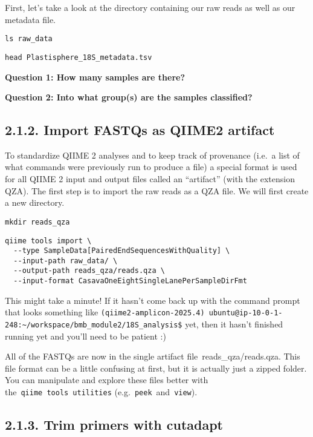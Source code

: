 \documentclass[
]{book}
\begin{document}
First, let's take a look at the directory containing our raw reads as well as our metadata file.

\begin{verbatim}
ls raw_data
\end{verbatim}

\begin{verbatim}
head Plastisphere_18S_metadata.tsv
\end{verbatim}

\textbf{Question 1: How many samples are there?}

\textbf{Question 2: Into what group(s) are the samples classified?}

\subsection{2.1.2. Import FASTQs as QIIME2 artifact}\label{import-fastqs-as-qiime2-artifact-1}

To standardize QIIME 2 analyses and to keep track of provenance (i.e.~a list of what commands were previously run to produce a file) a special format is used for all QIIME 2 input and output files called an ``artifact'' (with the extension QZA). The first step is to import the raw reads as a QZA file. We will first create a new directory.

\begin{verbatim}
mkdir reads_qza
\end{verbatim}

\begin{verbatim}
qiime tools import \
  --type SampleData[PairedEndSequencesWithQuality] \
  --input-path raw_data/ \
  --output-path reads_qza/reads.qza \
  --input-format CasavaOneEightSingleLanePerSampleDirFmt
\end{verbatim}

This might take a minute! If it hasn't come back up with the command prompt that looks something like \texttt{(qiime2-amplicon-2025.4)\ ubuntu@ip-10-0-1-248:\textasciitilde{}/workspace/bmb\_module2/18S\_analysis\$} yet, then it hasn't finished running yet and you'll need to be patient :)

All of the FASTQs are now in the single artifact file~reads\_qza/reads.qza. This file format can be a little confusing at first, but it is actually just a zipped folder. You can manipulate and explore these files better with the~\texttt{qiime\ tools~utilities} (e.g.~\texttt{peek}~and~\texttt{view}).

\subsection{2.1.3. Trim primers with cutadapt}\label{trim-primers-with-cutadapt-1}
\end{document}
